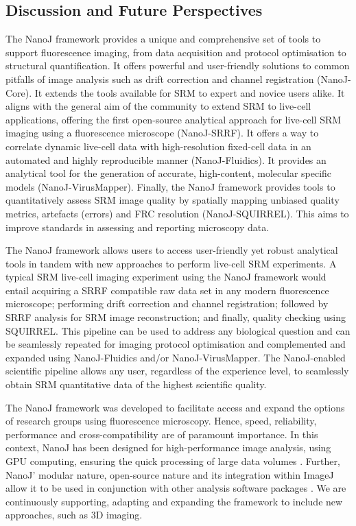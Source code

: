 \subsection*{Discussion and Future Perspectives}
 The NanoJ framework provides a unique and comprehensive set of tools to support fluorescence imaging, from data acquisition and protocol optimisation to structural quantification. It offers powerful and user-friendly solutions to common pitfalls of image analysis such as drift correction and channel registration (NanoJ-Core). It extends the tools available for SRM to expert and novice users alike. It aligns with the general aim of the community to extend SRM to live-cell applications, offering the first open-source analytical approach for live-cell SRM imaging using a fluorescence microscope (NanoJ-SRRF). It offers a way to correlate dynamic live-cell data with high-resolution fixed-cell data in an automated and highly reproducible manner (NanoJ-Fluidics). It provides an analytical tool for the generation of accurate, high-content, molecular specific models (NanoJ-VirusMapper). Finally, the NanoJ framework provides tools to quantitatively assess SRM image quality by spatially mapping unbiased quality metrics, artefacts (errors) and FRC resolution (NanoJ-SQUIRREL). This aims to improve standards in assessing and reporting microscopy data. 
 
 The NanoJ framework allows users to access user-friendly yet robust analytical tools in tandem with new approaches to perform live-cell SRM experiments. A typical SRM live-cell imaging experiment using the NanoJ framework would entail acquiring a SRRF compatible raw data set in any modern fluorescence microscope; performing drift correction and channel registration; followed by SRRF analysis for SRM image reconstruction; and finally, quality checking using SQUIRREL. This pipeline can be used to address any biological question and can be seamlessly repeated for imaging protocol optimisation and complemented and expanded using NanoJ-Fluidics and/or NanoJ-VirusMapper. The NanoJ-enabled scientific pipeline allows any user, regardless of the experience level, to seamlessly obtain SRM quantitative data of the highest scientific quality. 
 
 The NanoJ framework  was developed to facilitate access and expand the options of research groups using fluorescence microscopy. Hence, speed, reliability, performance and cross-compatibility are of paramount importance. In this context, NanoJ has been designed for high-performance image analysis, using GPU computing, ensuring the quick processing of large data volumes \cite{herbert2012single,pereira2015high,almada2015palm,beghin2017localization,douglass2016super}. Further, NanoJ' modular nature, open-source nature and its integration within ImageJ allow it to be used in conjunction with other analysis software packages \cite{sage2018super,weigert2017content,henriques2010quickpalm, laine2018milesim}. We are continuously supporting, adapting and expanding the framework to include new approaches, such as 3D imaging. 
 
